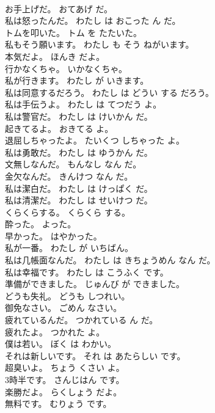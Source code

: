 \documentclass[8pt]{extreport}
\begin{document}
\begin{CJK}{UTF8}{min}
\\	お手上げだ。	おてあげ だ。	
\\	私は怒ったんだ。	わたし は おこった ん だ。	
\\	トムを叩いた。	トム を たたいた。	
\\	私もそう願います。	わたし も そう ねがいます。	
\\	本気だよ。	ほんき だよ。	
\\	行かなくちゃ。	いかなくちゃ。	
\\	私が行きます。	わたし が いきます。	
\\	私は同意するだろう。	わたし は どうい する だろう。	
\\	私は手伝うよ。	わたし は てつだう よ。	
\\	私は警官だ。	わたし は けいかん だ。	
\\	起きてるよ。	おきてる よ。	
\\	退屈しちゃったよ。	たいくつ しちゃった よ。	
\\	私は勇敢だ。	わたし は ゆうかん だ。	
\\	文無しなんだ。	もんなし なん だ。	
\\	金欠なんだ。	きんけつ なん だ。	
\\	私は潔白だ。	わたし は けっぱく だ。	
\\	私は清潔だ。	わたし は せいけつ だ。	
\\	くらくらする。	くらくら する。	
\\	酔った。	よった。	
\\	早かった。	はやかった。	
\\	私が一番。	わたし が いちばん。	
\\	私は几帳面なんだ。	わたし は きちょうめん なん だ。	
\\	私は幸福です。	わたし は こうふく です。	
\\	準備ができました。	じゅんび が できました。	
\\	どうも失礼。	どうも しつれい。	
\\	御免なさい。	ごめん なさい。	
\\	疲れているんだ。	つかれている ん だ。	
\\	疲れたよ。	つかれた よ。	
\\	僕は若い。	ぼく は わかい。	
\\	それは新しいです。	それ は あたらしい です。	
\\	超臭いよ。	ちょう くさい よ。	
\\	3時半です。	さんじはん です。	
\\	楽勝だよ。	らくしょう だよ。	
\\	無料です。	むりょう です。	

\end{CJK}
\end{document}
